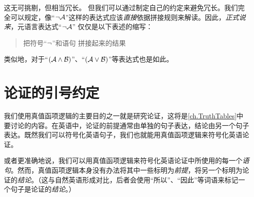这无可挑剔，但相当冗长。%
但我们可以通过制定自己的约定来避免冗长。我们完全可以规定，像“$\neg \mathcal{A}$”这样的表达式应该\emph{直接}依据拼接规则来解读。因此，\emph{正式说来}，元语言表达式“$\neg \mathcal{A}$”
仅仅是以下表述的缩写：


\begin{quote}
	把符号“$\neg$”和语句  拼接起来的结果
\end{quote}


类似地，对于“$(\mathcal{A} \wedge \mathcal{B})$”、“$(\mathcal{A} \vee \mathcal{B})$”等表达式也是如此。

\section{论证的引号约定}
我们使用真值函项逻辑的主要目的之一就是研究论证，这将是\cref{ch.TruthTables}中要讨论的内容。在英语中，论证的前提通常由单独的句子表达，结论由另一个句子表达。既然我们可以符号化英语句子，我们也就能用真值函项逻辑来符号化英语论证。

或者更准确地说，我们可以用真值函项逻辑来符号化英语论证中所使用的每一个\emph{语句}。然而，真值函项逻辑本身没有办法将其中一些标明为\emph{前提}，将另一个标明为论证的\emph{结论}。（这与自然英语形成对比，后者会使用“所以”、“因此”等词语来标记一个句子是论证的\emph{结论}。）




